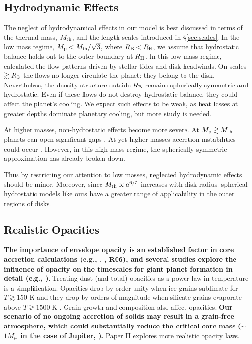 \documentclass[apj, numberedappendix]{emulateapj}
\newcommand{\RB}{R_{\rm B}}
\newcommand{\RH}{R_{\rm H}}
\newcommand{\pla}{_{\rm p}}
\begin{document}
\subsection{Hydrodynamic Effects}\label{sec:hydro}
The neglect of hydrodynamical effects in our model is best discussed in terms of the thermal mass, $M_{\rm th}$, and the length scales introduced in \S\ref{sec:scales}.  In the low mass regime, $M\pla < M_{\rm th}/ \sqrt{3}$, where $\RB < \RH$, we assume that hydrostatic balance holds out to the outer boundary at $\RH$.   In this low mass regime, \citet[]{Orm13} calculated the flow patterns driven by stellar tides and disk headwinds.     On scales $\gtrsim \RB$ the flows no longer circulate the planet: they belong to the disk.  Nevertheless, the density structure outside $\RB$ remains spherically symmetric and hydrostatic.  Even if these flows do not destroy hydrostatic balance, they could affect the planet's cooling.  We expect such effects to be weak, as heat losses at greater depths dominate planetary cooling, but more study is needed.

At higher masses, non-hydrostatic effects become more severe.  At $M\pla \gtrsim M_{\rm th}$ planets can open significant gaps \citep{zhu13}.  At yet higher masses accretion instabilities could occur \citep{AylBat12}.  However, in this high mass regime, the spherically symmetric approximation has already broken down. 

Thus by restricting our attention to low masses, neglected hydrodynamic effects should be minor.   Moreover, since $M_{\rm th} \propto a^{6/7}$ increases with disk radius, spherical hydrostatic models like ours have a greater range of applicability in the outer regions of disks. 


\subsection{Realistic Opacities}\label{sec:op}

\textbf{The importance of envelope opacity is an established factor in core accretion calculations (e.g., \citealt{stevenson82}, \citealt{ikoma00}, R06), and several studies explore the influence of opacity on the timescales for giant planet formation in detail (e.g., \citealt{HubBod05})}. Treating dust (and total) opacities as a power law in temperature is a simplification.  Opacities drop by order unity when ice grains sublimate for $T \gtrsim 150$ K and they drop by orders of magnitude when silicate grains evaporate above $T \gtrsim 1500$ K \citep{semenov03, FerAle05}.  Grain growth and composition also affect opacities. \textbf{Our scenario of no ongoing accretion of solids may result in a grain-free atmosphere, which could substantially reduce the critical core mass ($\sim$$1M_{\oplus}$ in the case of Jupiter, \citealt{hori10}).} Paper II explores more realistic opacity laws. 
\end{document}
